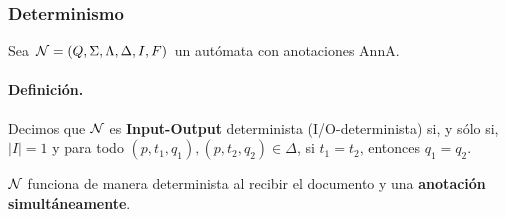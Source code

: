 
\newpage

\subsubsection{Determinismo}

Sea $\mathcal{N} = (Q,\Sigma, \Lambda, \Delta, I, F)$ un autómata con anotaciones AnnA.

\paragraph{Definición.} Decimos que $\mathcal{N}$ es \textbf{Input-Output} determinista (I/O-determinista) si, y sólo si, $|I| = 1$ y para todo $\left(p, t_1, q_1\right),\left(p, t_2, q_2\right) \in \Delta$, si $t_1 = t_2$, entonces $q_1 = q_2$. \bigbreak

$\mathcal{N}$ funciona de manera determinista al recibir el documento y una \textbf{anotación simultáneamente}.



